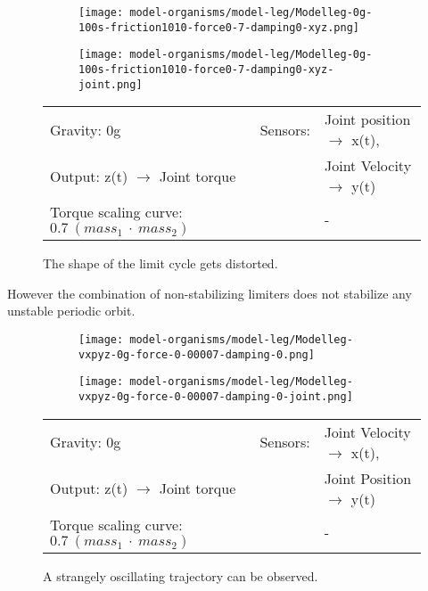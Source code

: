 \documentclass[main]{subfiles}
\begin{document}
\begin{figure}[H]
	\centering
		\begin{subfigure}[c]{0.45\textwidth}
	\texttt{[image: model-organisms/model-leg/Modelleg-0g-100s-friction1010-force0-7-damping0-xyz.png]}
		\end{subfigure}
	\begin{subfigure}[c]{0.45\textwidth}
	\texttt{[image: model-organisms/model-leg/Modelleg-0g-100s-friction1010-force0-7-damping0-xyz-joint.png]}
		\end{subfigure}
	\caption[Joint position \(\rightarrow\) x(t) and Joint Velocity \(\rightarrow\) y(t) limited chaotic controller controlling model leg]{The shape of the limit cycle gets distorted.}
	\begin{tabular}{l|ll}
	\hline 
	Gravity: 0g  & Sensors: & Joint position \(\rightarrow\) x(t),\\
	 Output: z(t) \(\rightarrow\) Joint torque &  & Joint Velocity \(\rightarrow\) y(t) \\
	  Torque scaling curve: \(0.7~(mass_1~\cdot~mass_2)\) & & - \\
	  \hline
	\end{tabular}

	\label{figure:limited-model-leg5}
\end{figure}

However the combination of non-stabilizing limiters does not stabilize any unstable periodic orbit.

\begin{figure}[H]
	\centering
		\begin{subfigure}[c]{0.45\textwidth}
	\texttt{[image: model-organisms/model-leg/Modelleg-vxpyz-0g-force-0-00007-damping-0.png]}
		\end{subfigure}
	\begin{subfigure}[c]{0.45\textwidth}
	\texttt{[image: model-organisms/model-leg/Modelleg-vxpyz-0g-force-0-00007-damping-0-joint.png]}
		\end{subfigure}
	\caption[Joint Velocity \(\rightarrow\) x(t) and Joint Position \(\rightarrow\) y(t) limited chaotic controller controlling model leg]{A strangely oscillating trajectory can be observed.}
	\begin{tabular}{l|ll}
	\hline 
	Gravity: 0g  & Sensors: & Joint Velocity \(\rightarrow\) x(t),\\
	 Output: z(t) \(\rightarrow\) Joint torque & & Joint Position \(\rightarrow\) y(t) \\
	  Torque scaling curve: \(0.7~(mass_1~\cdot~mass_2)\) & & - \\
	  \hline
	\end{tabular}

	\label{figure:limited-model-leg6}
\end{figure}
\end{document}
